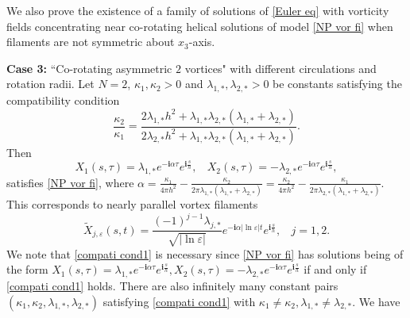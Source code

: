 \documentclass[12pt,reqno]{amsart}
\numberwithin{equation}{section}
\theoremstyle{definition}
\theoremstyle{remark}
\begin{document}
We also prove the existence  of a family of solutions of  \eqref{Euler eq} with vorticity fields  concentrating near co-rotating helical solutions of   model \eqref{NP vor fi} when filaments are not symmetric about $ x_3 $-axis. 

\textbf{Case 3:}   ``Co-rotating asymmetric $2 $ vortices" with different circulations and rotation radii. Let $ N= 2 $, $ \kappa_1,\kappa_2>0 $ and $ \lambda_{1,*},\lambda_{2,*}>0 $ be constants satisfying the compatibility condition
\begin{equation}\label{compati cond1} 
\frac{\kappa_2}{\kappa_1}=\frac{2\lambda_{1,*}h^2+\lambda_{1,*}\lambda_{2,*}(\lambda_{1,*}+\lambda_{2,*})}{2\lambda_{2,*}h^2+\lambda_{1,*}\lambda_{2,*}(\lambda_{1,*}+\lambda_{2,*})}.
\end{equation}
Then 
\begin{equation*} 
X_{1}(s,\tau)=\lambda_{1,*}e^{-\mathbf{i}\alpha\tau}e^{\mathbf{i}\frac{s}{h}},\ \ \ \ 	X_{2}(s,\tau)=-\lambda_{2,*}e^{-\mathbf{i}\alpha\tau}e^{\mathbf{i}\frac{s}{h}},
\end{equation*}
satisfies \eqref{NP vor fi}, where $ \alpha=\frac{\kappa_1}{4\pi h^2}  -\frac{\kappa_2}{2\pi \lambda_{1,*}(\lambda_{1,*}+\lambda_{2,*})}=\frac{\kappa_2}{4\pi h^2}  -\frac{\kappa_1}{2\pi \lambda_{2,*}(\lambda_{1,*}+\lambda_{2,*})}  $. This corresponds to nearly parallel vortex filaments  
\begin{equation}\label{fila 3}
\tilde{X}_{j,\varepsilon}(s,t)=\frac{(-1)^{j-1}\lambda_{j,*}}{\sqrt{|\ln\varepsilon|}}e^{-\mathbf{i}\alpha|\ln\varepsilon|t}e^{\mathbf{i}\frac{s}{h}},\ \ \ \ j=1,2. 
\end{equation}
We note that \eqref{compati cond1} is necessary since \eqref{NP vor fi} has solutions being of the form $ X_{1}(s,\tau)=\lambda_{1,*}e^{-\mathbf{i}\alpha\tau}e^{\mathbf{i}\frac{s}{h}}, X_{2}(s,\tau)=-\lambda_{2,*}e^{-\mathbf{i}\alpha\tau}e^{\mathbf{i}\frac{s}{h}}  $ if and only if \eqref{compati cond1} holds. There are also  infinitely many  constant pairs $ (\kappa_1, \kappa_2,\lambda_{1,*},\lambda_{2,*}) $ satisfying \eqref{compati cond1} with $ \kappa_1\neq \kappa_2, \lambda_{1,*}\neq \lambda_{2,*} $. We have 
\end{document}
